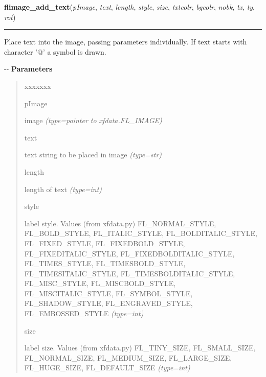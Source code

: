 \hspace{.8\funcindent}\begin{boxedminipage}{\funcwidth}

    \raggedright \textbf{flimage\_add\_text}(\textit{pImage}, \textit{text}, \textit{length}, \textit{style}, \textit{size}, \textit{txtcolr}, \textit{bgcolr}, \textit{nobk}, \textit{tx}, \textit{ty}, \textit{rot})

    \vspace{-1.5ex}

    \rule{\textwidth}{0.5\fboxrule}
\setlength{\parskip}{2ex}

Place text into the image, passing parameters individually. If text
starts with character '@' a symbol is drawn.

-{}-
\setlength{\parskip}{1ex}
      \textbf{Parameters}
      \vspace{-1ex}

      \begin{quote}
        \begin{Ventry}{xxxxxxx}

          \item[pImage]


image
            {\it (type=pointer to xfdata.FL\_IMAGE)}

          \item[text]


text string to be placed in image
            {\it (type=str)}

          \item[length]


length of text
            {\it (type=int)}

          \item[style]


label style. Values (from xfdata.py) FL\_NORMAL\_STYLE, FL\_BOLD\_STYLE,
FL\_ITALIC\_STYLE, FL\_BOLDITALIC\_STYLE, FL\_FIXED\_STYLE,
FL\_FIXEDBOLD\_STYLE, FL\_FIXEDITALIC\_STYLE, FL\_FIXEDBOLDITALIC\_STYLE,
FL\_TIMES\_STYLE, FL\_TIMESBOLD\_STYLE, FL\_TIMESITALIC\_STYLE,
FL\_TIMESBOLDITALIC\_STYLE, FL\_MISC\_STYLE, FL\_MISCBOLD\_STYLE,
FL\_MISCITALIC\_STYLE, FL\_SYMBOL\_STYLE, FL\_SHADOW\_STYLE,
FL\_ENGRAVED\_STYLE, FL\_EMBOSSED\_STYLE
            {\it (type=int)}

          \item[size]


label size. Values (from xfdata.py) FL\_TINY\_SIZE, FL\_SMALL\_SIZE,
FL\_NORMAL\_SIZE, FL\_MEDIUM\_SIZE, FL\_LARGE\_SIZE, FL\_HUGE\_SIZE,
FL\_DEFAULT\_SIZE
            {\it (type=int)}


\end{Ventry}
\end{quote}
\end{boxedminipage}
